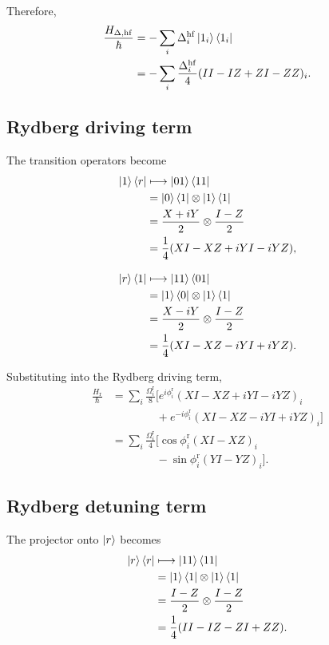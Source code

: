 \documentclass[amssymb,twocolumn,aps]{revtex4-2}
\begin{document}
Therefore,
\begin{align*}
    \frac{H_{\Delta,\mathrm{hf}}}{\hbar}
    &= -\sum_i\Delta_i^{\mathrm{hf}}
       \ket{1_i}\bra{1_i}\\
    &= -\sum_i\frac{\Delta_i^{\mathrm{hf}}}{4}
       (II-IZ+ZI-ZZ)_i.
\end{align*}

\subsection*{Rydberg driving term}

The transition operators become
\begin{align*}
    \ket{1}\bra{r}
    &\longmapsto \ket{01}\bra{11}\\
    &= \ket{0}\bra{1}\otimes\ket{1}\bra{1}\\
    &= \frac{X+iY}{2}\otimes\frac{I-Z}{2}\\
    &= \frac14(XI-XZ+iYI-iYZ),
    \\[8pt]
    \ket{r}\bra{1}
    &\longmapsto \ket{11}\bra{01}\\
    &= \ket{1}\bra{0}\otimes\ket{1}\bra{1}\\
    &= \frac{X-iY}{2}\otimes\frac{I-Z}{2}\\
    &= \frac14(XI-XZ-iYI+iYZ).
\end{align*}

Substituting into the Rydberg driving term,
\begin{align*}
    \frac{H_{\mathrm{r}}}{\hbar}
    &= \sum_i\frac{\Omega_i^{\mathrm{r}}}{8}
    \Big[
        e^{i\phi_i^{\mathrm{r}}}
        (XI-XZ+iYI-iYZ)_i\\
    &\qquad\qquad
        +e^{-i\phi_i^{\mathrm{r}}}
        (XI-XZ-iYI+iYZ)_i
    \Big]\\[6pt]
    &= \sum_i\frac{\Omega_i^{\mathrm{r}}}{4}
    \Big[
        \cos\phi_i^{\mathrm{r}}(XI-XZ)_i\\
    &\qquad\qquad
        -\sin\phi_i^{\mathrm{r}}(YI-YZ)_i
    \Big].
\end{align*}

\subsection*{Rydberg detuning term}

The projector onto $\ket{r}$ becomes
\begin{align*}
    \ket{r}\bra{r}
    &\longmapsto \ket{11}\bra{11}\\
    &= \ket{1}\bra{1}\otimes\ket{1}\bra{1}\\
    &= \frac{I-Z}{2}\otimes\frac{I-Z}{2}\\
    &= \frac14(II-IZ-ZI+ZZ).
\end{align*}
\end{document}
